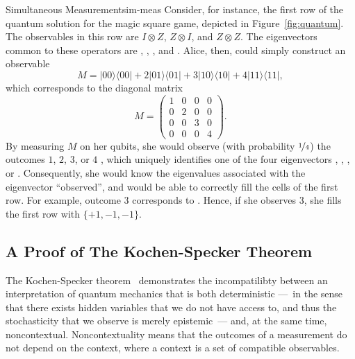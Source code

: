 \documentclass{llncs}
\newcommand{\ketbra}[2]{\ensuremath{| #1 \rangle \langle #2 |}}
\begin{document}
\begin{tcbexample}{Simultaneous Measurement}{sim-meas}
  Consider, for instance, the first row of the quantum solution for
  the magic square game, depicted in Figure~\ref{fig:quantum}. The
  observables in this row are \(I \otimes Z\), \(Z \otimes I\), and
  \(Z \otimes Z\). The eigenvectors common to these operators are
  , , , and . Alice, then, could
  simply construct an observable
  \[M = \ketbra{00}{00} + 2 \ketbra{01}{01} + 3 \ketbra{10}{10} + 4
    \ketbra{11}{11},\] which corresponds to the diagonal matrix
  \begin{equation*}
    M = \begin{pmatrix}
          1 & 0 & 0 & 0 \\
          0 & 2 & 0 & 0 \\
          0 & 0 & 3 & 0 \\
          0 & 0 & 0 & 4
    \end{pmatrix}.
  \end{equation*}
  By measuring \(M\) on her qubits, she would observe (with
  probability \(\nicefrac{1}{4}\)) the outcomes \(1\), \(2\), \(3\), or
  \(4\) , which uniquely identifies one of the four eigenvectors
  , , , or . Consequently, she would
  know the eigenvalues associated with the eigenvector ``observed'',
  and would be able to correctly fill the cells of the first row. For
  example, outcome \(3\) corresponds to . Hence, if she
  observes \(3\), she fills the first row with \(\{+1, -1, -1\}\).
\end{tcbexample}

\subsection{A Proof of The Kochen-Specker Theorem}
\label{sec:context}

The Kochen-Specker theorem~\cite{kochen:1967} demonstrates
the incompatilibty between an interpretation of quantum mechanics
that is both deterministic ---~in the sense that there exists
hidden variables that we do not have access to, and thus
the stochasticity that we observe is merely epistemic~--- and,
at the same time, noncontextual. Noncontextuality means that
the outcomes of a measurement do not depend on the context,
where a context is a set of compatible observables.
\end{document}
